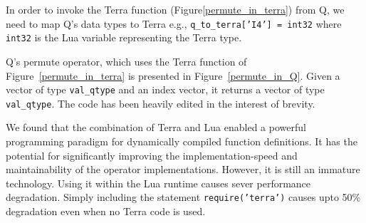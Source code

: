 In order to invoke the Terra function (Figure\ref{permute_in_terra}) from Q, we
need to map Q's data types to Terra e.g., 
{\tt q\_to\_terra['I4'] = int32}  where {\tt int32} is the Lua variable representing the Terra type.

Q's permute operator, which uses the Terra function of
Figure~\ref{permute_in_terra} 
is presented in Figure~\ref{permute_in_Q}. 
Given a vector of type {\tt val\_qtype} and an index vector, it 
returns a vector of type {\tt val\_qtype}.
The code has been heavily edited in the interest of brevity.

\begin{figure}
\centering
{}
\end{figure}

We found that 
the combination of Terra and Lua enabled a powerful programming paradigm for
dynamically compiled function definitions. It has the potential for significantly improving the implementation-speed and maintainability of the operator implementations. 
However, it is
still an immature technology. Using it within the Lua runtime causes sever
performance degradation. Simply including the statement 
{\tt require('terra')} causes upto 50\% degradation even when no Terra code is
used. 

